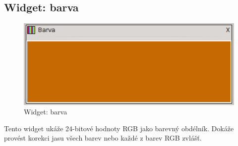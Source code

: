 \documentclass[12pt, a4paper, oneside]{article}
\begin{document}
\subsection{Widget: barva}
\begin{figure}[h]
\begin{center}
\includegraphics{img/w_col.png}
\caption{Widget: barva}
\end{center}
\end{figure}
Tento widget ukáže 24-bitové hodnoty RGB jako barevný obdélník. Dokáže provést korekci jasu všech barev nebo každé z barev RGB zvlášť.

\newpage
\end{document}
